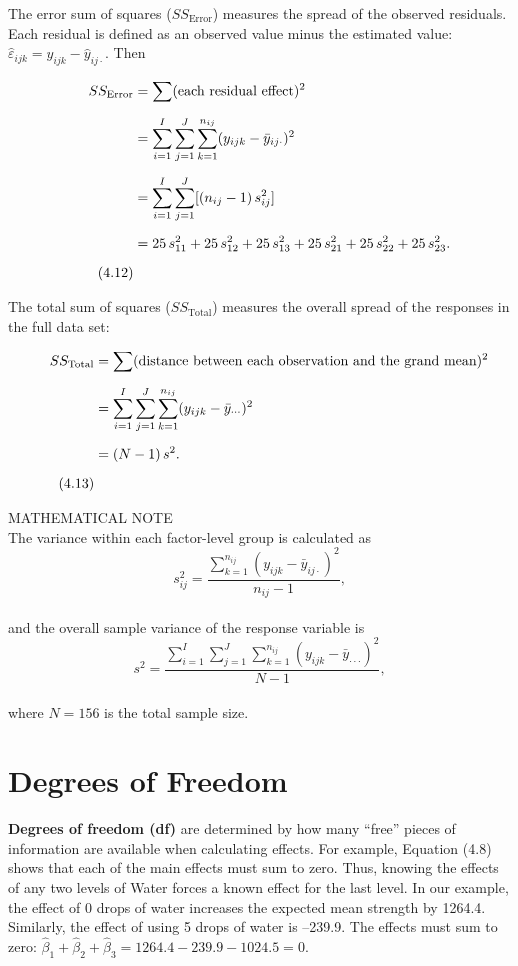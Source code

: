 \documentclass[
]{report}
\begin{document}
The error sum of squares (\(SS_{\text{Error}}\)) measures the spread of the observed residuals. Each residual is defined as an observed value minus the estimated value: \(\hat\varepsilon_{ijk} = y_{ijk} - \hat y_{ij\cdot}\). Then

\begin{align}
SS_{\text{Error}} \notag
  &= \sum (\text{each residual effect})^2 \\[6pt] \notag
  &= \sum_{i=1}^{I}\sum_{j=1}^{J}\sum_{k=1}^{n_{ij}} (y_{ijk} - \bar y_{ij\cdot})^2 \\[6pt] \notag
  &= \sum_{i=1}^{I}\sum_{j=1}^{J} [(n_{ij}-1)\,s_{ij}^2] \\[6pt] \notag
  &= 25\,s_{11}^2 + 25\,s_{12}^2 + 25\,s_{13}^2 + 25\,s_{21}^2 + 25\,s_{22}^2 + 25\,s_{23}^2. \\[6pt] \tag{4.12}
\end{align}

The total sum of squares (\(SS_{\text{Total}}\)) measures the overall spread of the responses in the full data set:

\begin{align}
SS_{\text{Total}} \notag
  &= \sum (\text{distance between each observation and the grand mean})^2 \\[6pt] \notag
  &= \sum_{i=1}^{I}\sum_{j=1}^{J}\sum_{k=1}^{n_{ij}} (y_{ijk} - \bar y_{\cdot\cdot\cdot})^2 \\[6pt] \notag
  &= (N-1)\,s^2. \\[6pt] \tag{4.13}
\end{align}

MATHEMATICAL NOTE\\
The variance within each factor-level group is calculated as\\
\[s_{ij}^2 = \frac{\sum_{k=1}^{n_{ij}} (y_{ijk} - \bar y_{ij\cdot})^2}{n_{ij}-1},\]\\
and the overall sample variance of the response variable is\\
\[s^2 = \frac{\sum_{i=1}^I\sum_{j=1}^J\sum_{k=1}^{n_{ij}} (y_{ijk} - \bar y_{\cdot\cdot\cdot})^2}{N-1},\]\\
where \(N = 156\) is the total sample size.

\section{Degrees of Freedom}\label{degrees-of-freedom}

\textbf{Degrees of freedom (df)} are determined by how many ``free'' pieces of information are available when calculating effects. For example, Equation (4.8) shows that each of the main effects must sum to zero. Thus, knowing the effects of any two levels of Water forces a known effect for the last level. In our example, the effect of 0 drops of water increases the expected mean strength by 1264.4. Similarly, the effect of using 5 drops of water is --239.9. The effects must sum to zero: \(\hat\beta_1 + \hat\beta_2 + \hat\beta_3 = 1264.4 - 239.9 - 1024.5 = 0.\)
\end{document}
